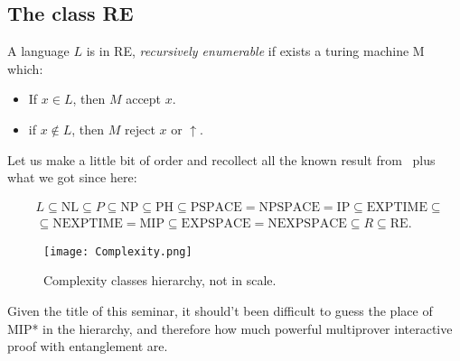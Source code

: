 \subsection{The class RE}

\begin{defn}
A language $L$ is in RE, \emph{recursively enumerable} if exists a turing machine M which:
\begin{itemize}
\item If $x \in L$, then $M$ accept $x$.
\item if $x \notin L$, then $M$ reject $x$ or $\uparrow$.
\end{itemize}
\end{defn}

Let us make a little bit of order and recollect all the known result from~\cite{papadimitriou1994computational} plus what we got since here:

\begin{equation}
\begin{split}
    &L \subseteq \text{NL} \subseteq P \subseteq \text{NP} \subseteq \text{PH} \subseteq \text{PSPACE} = \text{NPSPACE} = \text{IP} \subseteq \text{EXPTIME} \subseteq  \\
    &\subseteq \text{NEXPTIME} = \text{MIP} \subseteq \text{EXPSPACE} = \text{NEXPSPACE} \subseteq R \subseteq \text{RE}.
\end{split}
\end{equation}

\begin{figure}[htb]
    \texttt{[image: Complexity.png]}
    \centering
    \caption{Complexity classes hierarchy, not in scale.}
    \end{figure}

Given the title of this seminar, it should't been difficult to guess the place of MIP* in the hierarchy, and therefore how much powerful multiprover interactive proof with entanglement are.

